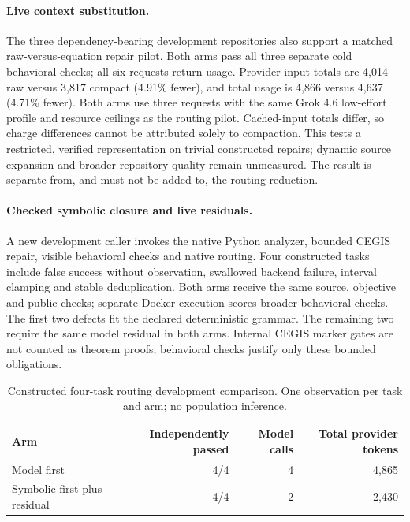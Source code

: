 \paragraph{Live context substitution.}
The three dependency-bearing development repositories also support a matched
raw-versus-equation repair pilot. Both arms pass all three separate cold
behavioral checks; all six requests return usage. Provider input totals are
4,014 raw versus 3,817 compact (4.91\% fewer),
and total usage is 4,866 versus 4,637 (4.71\%
fewer). Both arms use three requests with the same Grok 4.6 low-effort profile
and resource ceilings as the routing pilot. Cached-input totals differ, so
charge differences cannot be attributed solely to compaction. This tests a
restricted, verified representation on trivial constructed repairs; dynamic
source expansion and broader repository quality remain unmeasured. The result
is separate from, and must not be added to, the routing reduction.

\paragraph{Checked symbolic closure and live residuals.}
A new development caller invokes the native Python analyzer, bounded CEGIS
repair, visible behavioral checks and native routing. Four constructed tasks
include false success without observation, swallowed backend failure, interval
clamping and stable deduplication. Both arms receive the same source, objective
and public checks; separate Docker execution scores broader behavioral checks.
The first two defects fit the declared deterministic grammar. The remaining two
require the same model residual in both arms. Internal CEGIS marker gates are
not counted as theorem proofs; behavioral checks justify only these bounded
obligations.

\begin{table}[htbp]
\centering
\caption{Constructed four-task routing development comparison. One observation
per task and arm; no population inference.}
\label{tab:routing-development}
\begin{tabular}{lrrr}
\toprule
Arm & Independently passed & Model calls & Total provider tokens \\
\midrule
Model first & 4/4 & 4 & 4,865 \\
Symbolic first plus residual & 4/4 & 2 & 2,430 \\
\bottomrule
\end{tabular}
\end{table}

